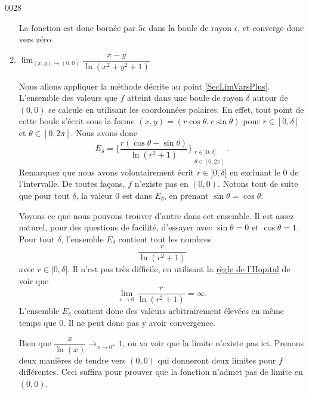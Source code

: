 \begin{corrige}{0028}
\begin{enumerate}
\begin{alternative}
La fonction est donc bornée par $5\epsilon$ dans la boule de rayon $\epsilon$, et converge donc vers zéro.
\end{alternative}



\item   $\lim_{(x,y)\rightarrow (0,0)} \dfrac{x-y}{\ln(x^2+y^2+1)}$
																	    
Nous allons appliquer la méthode décrite au point \ref{SecLimVarsPlus}. L'ensemble des valeurs que $f$ atteint dans une boule de rayon $\delta$ autour de $(0,0)$ se calcule en utilisant les coordonnées polaires. En effet, tout point de cette boule s'écrit sous la forme $(x,y)=(r\cos\theta,r\sin\theta)$ pour $r\in[0,\delta]$ et $\theta\in[0,2\pi]$. Nous avons donc
\begin{equation}
	E_{\delta}=\big\{  \frac{ r(\cos\theta-\sin\theta) }{ \ln(r^2+1) } \big\}_{\substack{r\in]0,\delta]\\\theta\in[0,2\pi]}}.
\end{equation}
Remarquez que nous avons volontairement écrit $r\in]0,\delta]$ en excluant le $0$ de l'intervalle. De toutes façons, $f$ n'existe pas en $(0,0)$. Notons tout de suite que pour tout $\delta$, la valeur $0$ est dans $E_{\delta}$, en prenant $\sin\theta=\cos\theta$.

Voyons ce que nous pouvons trouver d'autre dans cet ensemble. Il est assez naturel, pour des questions de facilité, d'essayer avec $\sin\theta=0$ et $\cos\theta=1$. Pour tout $\delta$, l'ensemble $E_{\delta}$ contient tout les nombres
\begin{equation}
	\frac{ r }{ \ln(r^2+1) }
\end{equation}
avec $r\in]0,\delta]$. Il n'est pas très difficile, en utilisant la \href{http://fr.wikipedia.org/wiki/Règle_de_L'Hôpital}{règle de l'Hopital} de voir que 
\begin{equation}
	\lim_{r\to 0}\frac{ r }{ \ln(r^2+1) }=\infty.
\end{equation}
L'ensemble $E_{\delta}$ contient donc des valeurs arbitrairement élevées en même temps que $0$. Il ne peut donc pas y avoir convergence.


\begin{alternative}
	
	Bien que 	$\dfrac{x}{\ln(x)} \longrightarrow_{x\rightarrow 0^+}1$, on va voir que la limite n'existe pas ici. Prenons deux	 	manières de tendre vers $(0,0)$ qui donneront deux limites pour $f$ différentes. Ceci suffira pour prouver que la fonction n'admet pas de limite en $(0,0)$.


\end{alternative}
\end{enumerate}
\end{corrige}
